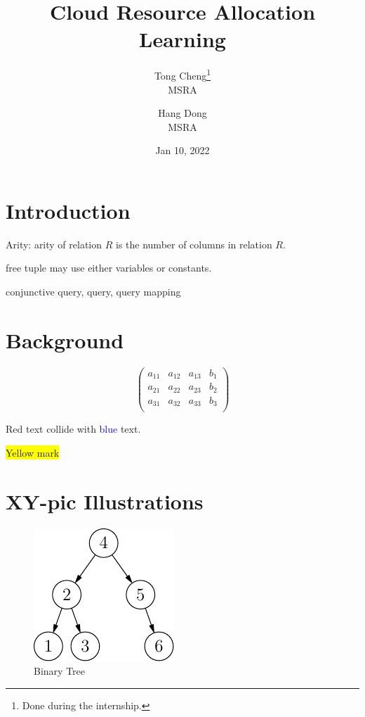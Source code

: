 \documentclass[a4paper, 12pt, twocolumn]{article}
\title{Cloud Resource Allocation Learning}
\author{
    Tong Cheng\thanks{Done during the internship.} \\
    MSRA 
    \and 
    Hang Dong \\
    MSRA}
\date{Jan 10, 2022}
\begin{document}
\maketitle
\tableofcontents
\section{Introduction}

Arity: arity of relation $R$ is the number of columns in relation $R$.

free tuple may use either variables or constants.

conjunctive query, query, query mapping

\section{Background}

\begin{equation}
\left(
\begin{array}{ccc|c}
   a_{11} & a_{12} & a_{13} & b_{1} \\
   a_{21} & a_{22} & a_{23} & b_{2} \\
   a_{31} & a_{32} & a_{33} & b_{3} \\
\end{array}
\right)    
\end{equation}

\color{red}Red text collide with \textcolor{blue}{blue} text.

\colorbox{yellow}{Yellow mark}
\color{black}

\section{XY-pic Illustrations}




\begin{figure}
    \centering
    \includegraphics{fig}
    \caption{Binary Tree}
\end{figure}
\end{document}
